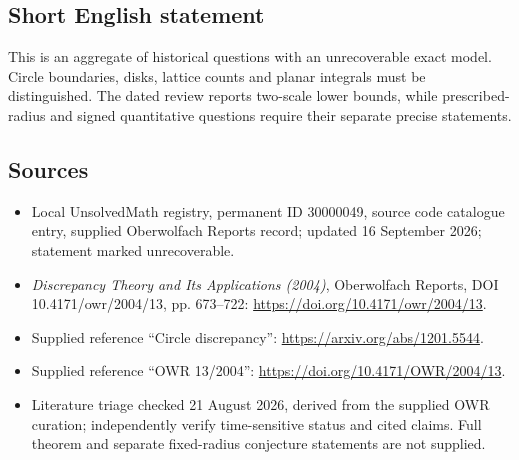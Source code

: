 \documentclass[11pt]{article}
\begin{document}
\subsection{Short English statement}
This is an aggregate of historical questions with an unrecoverable exact model. Circle boundaries, disks, lattice counts and planar integrals must be distinguished. The dated review reports two-scale lower bounds, while prescribed-radius and signed quantitative questions require their separate precise statements.
\subsection{Sources}
\begin{itemize}
\item Local UnsolvedMath registry, permanent ID 30000049, source code catalogue entry, supplied Oberwolfach Reports record; updated 16 September 2026; statement marked unrecoverable.
\item \emph{Discrepancy Theory and Its Applications (2004)}, Oberwolfach Reports, DOI 10.4171/owr/2004/13, pp. 673--722: \url{https://doi.org/10.4171/owr/2004/13}.
\item Supplied reference ``Circle discrepancy'': \url{https://arxiv.org/abs/1201.5544}.
\item Supplied reference ``OWR 13/2004'': \url{https://doi.org/10.4171/OWR/2004/13}.
\item Literature triage checked 21 August 2026, derived from the supplied OWR curation; independently verify time-sensitive status and cited claims. Full theorem and separate fixed-radius conjecture statements are not supplied.
\end{itemize}
\end{document}
